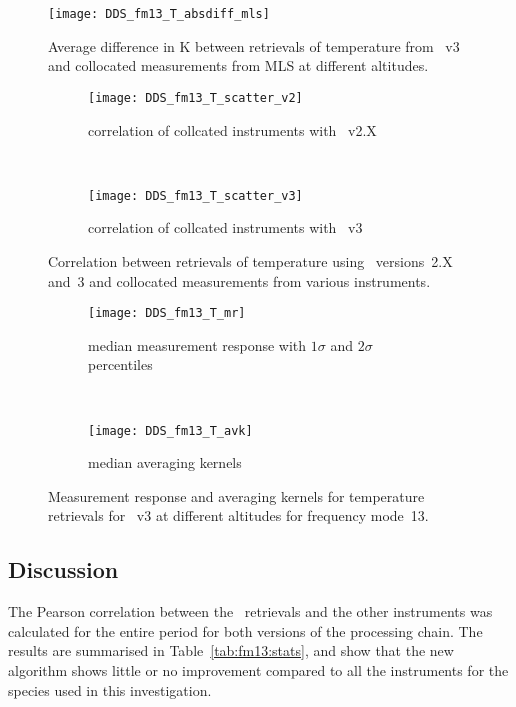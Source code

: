 \begin{figure}[tbhp]
    \centering
    \texttt{[image: DDS\_fm13\_T\_absdiff\_mls]}
    \caption{Average difference in K between retrievals of temperature from
    \smr~v3 and collocated measurements from MLS at different altitudes.}
    \label{fig:fm13:T:profiles}
        \label{fig:fm13:T:profiles:MLS}
\end{figure}

\begin{figure}[tbhp]
    \centering
    \begin{subfigure}[b]{0.49\textwidth}
        \texttt{[image: DDS\_fm13\_T\_scatter\_v2]}
        \caption{correlation of collcated instruments with \smr~v2.X}
        \label{fig:fm13:T:scatter:v2}
    \end{subfigure}
    \,
    \begin{subfigure}[b]{0.49\textwidth}
        \texttt{[image: DDS\_fm13\_T\_scatter\_v3]}
        \caption{correlation of collcated instruments with \smr~v3}
        \label{fig:fm13:T:scatter:v3}
    \end{subfigure}
    \caption{Correlation between retrievals of temperature using \smr\
    versions~2.X and~3 and collocated measurements from various instruments.}
    \label{fig:fm13:T:scatter}
\end{figure}

\begin{figure}[tbhp]
    \centering
    \begin{subfigure}[b]{0.49\textwidth}
        \texttt{[image: DDS\_fm13\_T\_mr]}
        \caption{median measurement response with $1\sigma$ and $2\sigma$
        percentiles}
        \label{fig:fm13:T:mr}
    \end{subfigure}
    \,
    \begin{subfigure}[b]{0.49\textwidth}
        \texttt{[image: DDS\_fm13\_T\_avk]}
        \caption{median averaging kernels\newline~}
        \label{fig:fm13:T:avk}
    \end{subfigure}
    \caption{Measurement response and averaging kernels for temperature
    retrievals for \smr~v3 at different altitudes for frequency mode~13.}
    \label{fig:fm13:T:mr_avk}
\end{figure}


\subsection{Discussion}
\label{sec:fm13:discussion}
The Pearson correlation between the \smr\ retrievals and the other instruments
was calculated for the entire period for both versions of the processing chain.
The results are summarised in Table~\ref{tab:fm13:stats}, and show that the
new algorithm shows little or no improvement compared to all the instruments
for the species used in this investigation.


